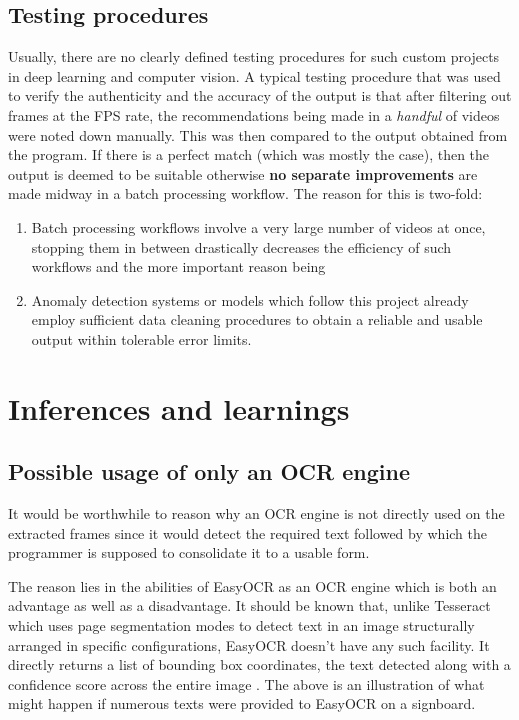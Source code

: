 \subsection{Testing procedures}

Usually, there are no clearly defined testing procedures for such custom projects in deep learning and computer vision. A typical testing procedure that was used to verify the authenticity and the accuracy of the output is that after filtering out frames at the FPS rate, the recommendations being made in a \textit{handful} of videos were noted down manually. This was then compared to the output obtained from the program. If there is a perfect match (which was mostly the case), then the output is deemed to be suitable otherwise \textbf{no separate improvements} are made midway in a batch processing workflow. The reason for this is two-fold:

\begin{enumerate}

 \item Batch processing workflows involve a very large number of videos at once, stopping them in between drastically decreases the efficiency of such workflows and the more important reason being

 \item Anomaly detection systems or models which follow this project already employ sufficient data cleaning procedures to obtain a reliable and usable output within tolerable error limits.

\end{enumerate}

\section{Inferences and learnings}

\subsection{Possible usage of only an OCR engine}

It would be worthwhile to reason why an OCR engine is not directly used on the extracted frames since it would detect the required text followed by which the programmer is supposed to consolidate it to a usable form. \par

The reason lies in the abilities of EasyOCR as an OCR engine which is both an advantage as well as a disadvantage. It should be known that, unlike Tesseract which uses page segmentation modes \cite{Rosebroc2021} to detect text in an image structurally arranged in specific configurations, EasyOCR doesn’t have any such facility. It directly returns a list of bounding box coordinates, the text detected along with a confidence score across the entire image \cite{Jaided}. The above is an illustration of what might happen if numerous texts were provided to EasyOCR on a signboard.

